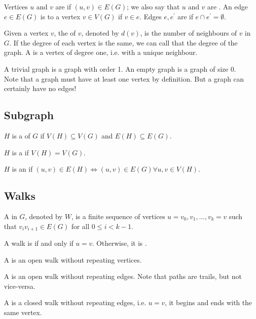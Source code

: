 Vertices $u$ and $v$ are  if $(u,v) \in E(G)$; we also say that $u$ and $v$ are . An edge $e \in E(G)$ is  to a vertex $v \in V(G)$ if $v \in e$. Edges $e, e^\prime$ are  if $e \cap e^\prime = \emptyset$.

Given a vertex $v$, the  of $v$, denoted by $d(v)$, is the number of neighbours of $v$ in $G$. If the degree of each vertex is the same, we can call that the degree of the graph. A  is a vertex of degree one, i.e. with a unique neighbour.

\begin{remark}
A trivial graph is a graph with order 1. An empty graph is a graph of size 0. 
Note that a graph must have at least one vertex by definition. But a graph can certainly have no edges!
\end{remark}

\subsection{Subgraph}
\begin{definition}
$H$ is a  of $G$ if $V(H) \subseteq V(G)$ and $E(H) \subseteq E(G)$.
\end{definition}

$H$ is a  if $V(H)=V(G)$.

$H$ is an  if $(u,v) \in E(H) \iff (u,v) \in E(G) \forall u, v \in V(H)$.

\subsection{Walks}
\begin{definition}
A  in $G$, denoted by $W$, is a finite sequence of vertices $u=v_0,v_1,\dots,v_k=v$ such that $v_i v_{i+1} \in E(G)$ for all $0 \le i < k-1$.
\end{definition}

A walk is  if and only if $u=v$. Otherwise, it is .

A  is an open walk without repeating vertices.

A  is an open walk without repeating edges.
Note that paths are trails, but not vice-versa.

A  is a closed walk without repeating edges, i.e. $u=v$, it begins and ends with the same vertex.

